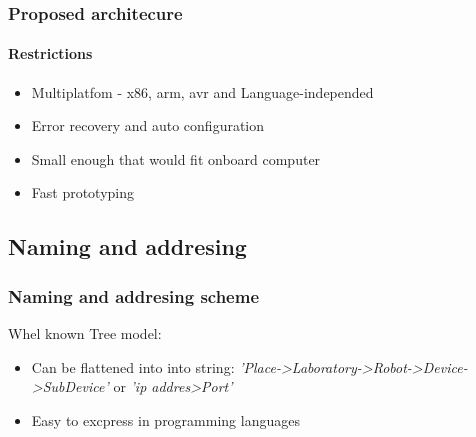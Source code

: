 \documentclass{beamer}
\begin{document}
\begin{frame}
\frametitle{Proposed architecure}

\framesubtitle{Restrictions}

\begin{itemize}
  \item Multiplatfom - x86, arm, avr and Language-independed
  \item Error recovery and auto configuration
  \item Small enough that would fit onboard computer
  \item Fast prototyping
\end{itemize}

\end{frame}

\subsection{Naming and addresing}
\begin{frame}
\frametitle{Naming and addresing scheme}
Whel known Tree model:
\begin{itemize}
  \item Can be flattened into into string:
  \emph{'Place->Laboratory->Robot->Device->SubDevice'} or
  \emph{'ip addres>Port'}
  \item Easy to excpress in programming languages
\end{itemize}

\end{frame}
\end{document}
